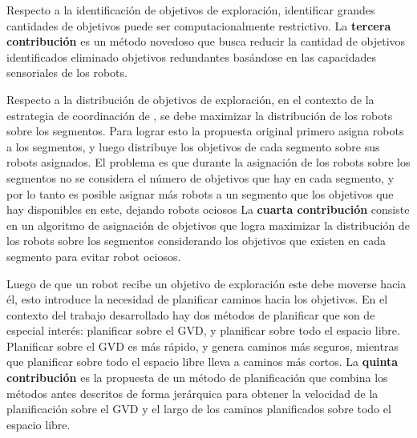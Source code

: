 Respecto a la identificación de objetivos de exploración, identificar grandes
cantidades de objetivos puede ser computacionalmente restrictivo. La
\textbf{tercera contribución} es un método novedoso que busca reducir la
cantidad de objetivos identificados eliminado objetivos redundantes basándose
en las capacidades sensoriales de los robots. 

Respecto a la distribución de objetivos de exploración, en el contexto de la
estrategia de coordinación de \cite{wurm2008coordinated}, se debe maximizar la
distribución de los robots sobre los segmentos. Para lograr esto la propuesta
original primero asigna robots a los segmentos, y luego distribuye los
objetivos de cada segmento sobre sus robots asignados. El problema es que
durante la asignación de los robots sobre los segmentos no se considera el
número de objetivos que hay en cada segmento, y por lo tanto es posible
asignar más robots a un segmento que los objetivos que hay disponibles en este,
dejando robots ociosos La \textbf{cuarta contribución} consiste en un
algoritmo de asignación de objetivos que logra maximizar la distribución de los
robots sobre los segmentos considerando los objetivos que existen en cada
segmento para evitar robot ociosos.

Luego de que un robot recibe un objetivo de exploración este debe moverse hacia
él, esto introduce la necesidad de planificar caminos hacia los objetivos. En el
contexto del trabajo desarrollado hay dos métodos de planificar que son de
especial interés: planificar sobre el GVD, y planificar sobre todo el espacio
libre. Planificar sobre el GVD es más rápido, y genera caminos más
seguros, mientras que  planificar sobre todo el espacio libre lleva a caminos más
cortos. La \textbf{quinta contribución} es la propuesta de un método de planificación
que combina los métodos antes descritos de forma jerárquica para obtener la
velocidad de la planificación sobre el GVD y el largo de los caminos
planificados sobre todo el espacio libre.




